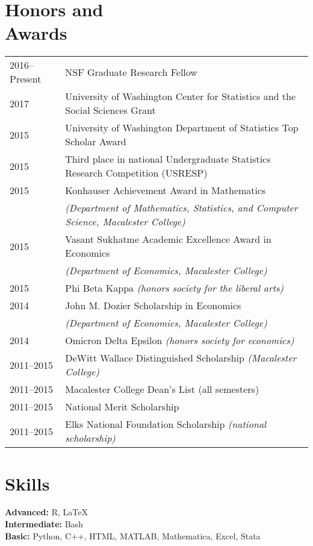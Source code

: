 \documentclass[margin,centered]{res}
\begin{document}
\begin{resume}
\section{\sc Honors and\\ Awards}

\begin{tabular}{@{}p{0.8in}p{4in}}
2016--Present & NSF Graduate Research Fellow\\
2017 & University of Washington Center for Statistics and the Social Sciences Grant\\
2015 & University of Washington Department of Statistics Top Scholar Award\\
2015 & Third place in national Undergraduate Statistics Research Competition (USRESP)\\
2015 & Konhauser Achievement Award in Mathematics \\
&\textit{(Department of Mathematics, Statistics, and Computer Science, Macalester College)}\\
2015 & Vasant Sukhatme Academic Excellence Award in Economics\\& \textit{(Department of Economics, Macalester College)}\\
2015 & Phi Beta Kappa \textit{(honors society for the liberal arts)}\\
2014 & John M. Dozier Scholarship in Economics \\ &\textit{(Department of Economics, Macalester College)}\\
2014 & Omicron Delta Epsilon \textit{(honors society for economics)}\\
2011--2015 & DeWitt Wallace Distinguished Scholarship \textit{(Macalester College)}\\
2011--2015 & Macalester College Dean's List (all semesters)\\
2011--2015 & National Merit Scholarship \\
2011--2015 & Elks National Foundation Scholarship \textit{(national scholarship)}\\
\end{tabular}





\section{\sc Skills}
{\bf Advanced:} R, LaTeX\\
{\bf Intermediate:} Bash\\
{\bf Basic:} Python, C++, HTML, MATLAB, Mathematica, Excel, Stata



\end{resume}
\end{document}
